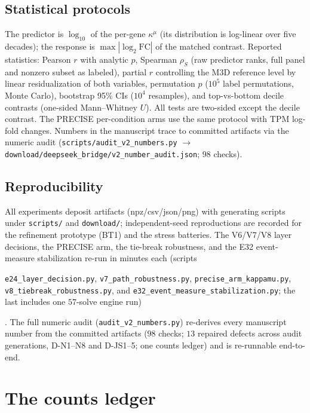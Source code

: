 \documentclass[11pt,a4paper]{article}
\theoremstyle{plain}
\theoremstyle{definition}
\theoremstyle{remark}
\newcommand{\kmu}{\kappa^{\mu}}
\begin{document}
\subsection{Statistical protocols}

The predictor is $\log_{10}$ of the per-gene $\kmu$ (its
distribution is log-linear over five decades); the response is
$\max|\log_2 \mathrm{FC}|$ of the matched contrast. Reported
statistics: Pearson $r$ with analytic $p$, Spearman $\rho_S$
(raw predictor ranks, full panel and nonzero subset as labeled),
partial $r$ controlling the M3D reference level by linear
residualization of both variables, permutation $p$ ($10^5$
label permutations, Monte Carlo), bootstrap 95\% CIs ($10^4$
resamples), and top-vs-bottom decile contrasts (one-sided
Mann--Whitney $U$). All tests are two-sided except the decile
contrast. The PRECISE per-condition arms use the same protocol
with TPM log-fold changes. Numbers in the manuscript trace to
committed artifacts via the numeric audit
(\texttt{scripts/audit\_v2\_numbers.py} $\to$
\texttt{download/deepseek\_bridge/v2\_number\_audit.json};
$98$ checks).

\subsection{Reproducibility}

All experiments deposit artifacts (npz/csv/json/png) with
generating scripts under \texttt{scripts/} and
\texttt{download/}; independent-seed reproductions are recorded
for the refinement prototype (BT1) and the stress batteries. The
V6/V7/V8 layer decisions, the PRECISE arm, the tie-break
robustness, and the E32 event-measure stabilization re-run in
minutes each (scripts
{\sloppy
\texttt{e24\_layer\_\allowbreak decision.py},
\texttt{v7\_path\_\allowbreak robustness.py},
\texttt{precise\_arm\_\allowbreak kappamu.py},
\texttt{v8\_tiebreak\_\allowbreak robustness.py}, and
\texttt{e32\_event\_\allowbreak measure\_\allowbreak stabilization.py};
the last
includes one $57$-solve engine run)\par}. The full numeric audit
(\texttt{audit\_v2\_\allowbreak numbers.py}) re-derives every manuscript
number from the committed artifacts ($98$ checks; $13$ repaired defects
across audit generations, D-N1--N8 and D-JS1--5; one counts ledger) and
is re-runnable end-to-end.

\appendix
\section{The counts ledger}\label{sec:counts}
\end{document}
